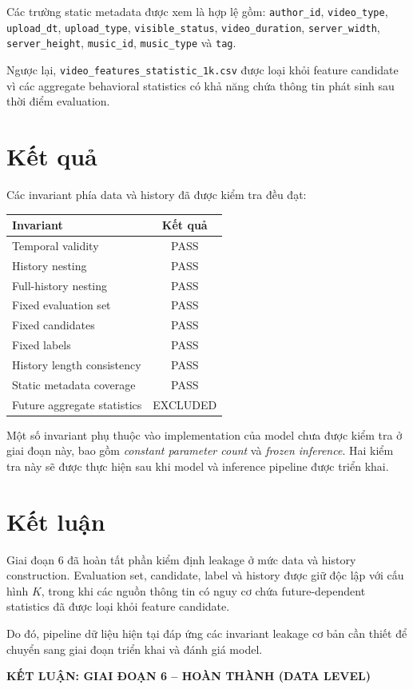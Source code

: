 \documentclass[12pt,a4paper]{article}
\begin{document}
Các trường static metadata được xem là hợp lệ gồm: \texttt{author\_id}, \texttt{video\_type}, \texttt{upload\_dt}, \texttt{upload\_type}, \texttt{visible\_status}, \texttt{video\_duration}, \texttt{server\_width}, \texttt{server\_height}, \texttt{music\_id}, \texttt{music\_type} và \texttt{tag}.

Ngược lại, \texttt{video\_features\_statistic\_1k.csv} được loại khỏi feature candidate vì các aggregate behavioral statistics có khả năng chứa thông tin phát sinh sau thời điểm evaluation.

\section{Kết quả}
Các invariant phía data và history đã được kiểm tra đều đạt:

\begin{center}
\begin{tabular}{lc}
\toprule
\textbf{Invariant} & \textbf{Kết quả} \\
\midrule
Temporal validity & PASS \\
History nesting & PASS \\
Full-history nesting & PASS \\
Fixed evaluation set & PASS \\
Fixed candidates & PASS \\
Fixed labels & PASS \\
History length consistency & PASS \\
Static metadata coverage & PASS \\
Future aggregate statistics & EXCLUDED \\
\bottomrule
\end{tabular}
\end{center}

Một số invariant phụ thuộc vào implementation của model chưa được kiểm tra ở giai đoạn này, bao gồm \textit{constant parameter count} và \textit{frozen inference}. Hai kiểm tra này sẽ được thực hiện sau khi model và inference pipeline được triển khai.

\section{Kết luận}
Giai đoạn 6 đã hoàn tất phần kiểm định leakage ở mức data và history construction. Evaluation set, candidate, label và history được giữ độc lập với cấu hình $K$, trong khi các nguồn thông tin có nguy cơ chứa future-dependent statistics đã được loại khỏi feature candidate.

Do đó, pipeline dữ liệu hiện tại đáp ứng các invariant leakage cơ bản cần thiết để chuyển sang giai đoạn triển khai và đánh giá model.

\vspace{10pt}
\begin{center}
\large\textbf{KẾT LUẬN: GIAI ĐOẠN 6 -- HOÀN THÀNH (DATA LEVEL)}
\end{center}
\end{document}
